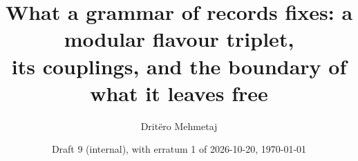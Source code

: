 \documentclass[11pt]{article}
\title{What a grammar of records fixes: a modular flavour triplet,\\ its couplings, and the boundary of what it leaves free}
\author{Drit\"ero Mehmetaj}
\date{Draft 9 (internal), with erratum 1 of 2026-10-20, \today}
\theoremstyle{definition}
\theoremstyle{remark}
\begin{document}
\maketitle

\begin{abstract}

\end{abstract}












\appendix





\clearpage


\end{document}
